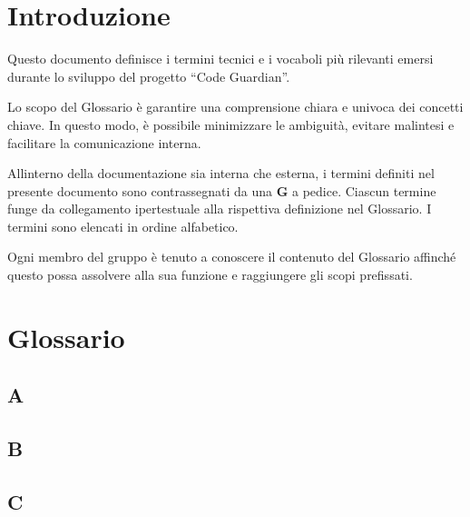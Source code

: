 \documentclass[12pt, a4paper]{article}
\begin{document}
\newpage


\tableofcontents
\iftotaltables  %
    \vspace{1cm}
    \listoftables
\fi

\iftotalfigures
    \vspace{1cm}
    \listoffigures
\fi
\newpage


\section{Introduzione}

Questo documento definisce i termini tecnici e i vocaboli più rilevanti
emersi durante lo sviluppo del progetto ``Code Guardian''.

Lo scopo del Glossario è garantire una comprensione chiara e univoca dei
concetti chiave. In questo modo, è possibile minimizzare le ambiguità,
evitare malintesi e facilitare la comunicazione interna.

All\textquotesingle interno della documentazione sia interna che
esterna, i termini definiti nel presente documento sono contrassegnati
da una \textbf{G} a pedice. Ciascun termine funge da collegamento
ipertestuale alla rispettiva definizione nel Glossario. I termini sono
elencati in ordine alfabetico.

Ogni membro del gruppo è tenuto a conoscere il contenuto del Glossario
affinché questo possa assolvere alla sua funzione e raggiungere gli
scopi prefissati.

\section{Glossario}

\subsection{A}

\subsection{B}

\subsection{C}
\end{document}
